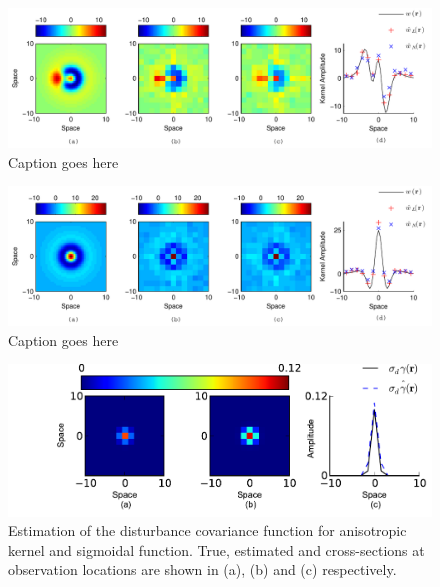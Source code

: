 \documentclass[10pt,twocolumn,twoside]{IEEEtran}
\begin{document}
\begin{figure}[ht]
	\centering
		\includegraphics[scale=1]{./Graph/AnisoKernelIEEE.pdf}
	\caption{Caption goes here}
	\label{fig:label}
\end{figure}

\begin{figure}[ht]
	\centering
		\includegraphics[scale=1]{./Graph/IsoKernelIEEE.pdf}
	\caption{Caption goes here}
	\label{fig:label}
\end{figure}  

\begin{figure}[ht]
	\centering
		\includegraphics[scale=1]{./Graph/DisturbanceWidthEstimation.pdf}
	\caption{Estimation of the disturbance covariance function for anisotropic kernel and sigmoidal function. True, estimated and cross-sections at observation locations are shown in (a), (b) and (c) respectively.}
	\label{fig:label}
\end{figure}
\end{document}
